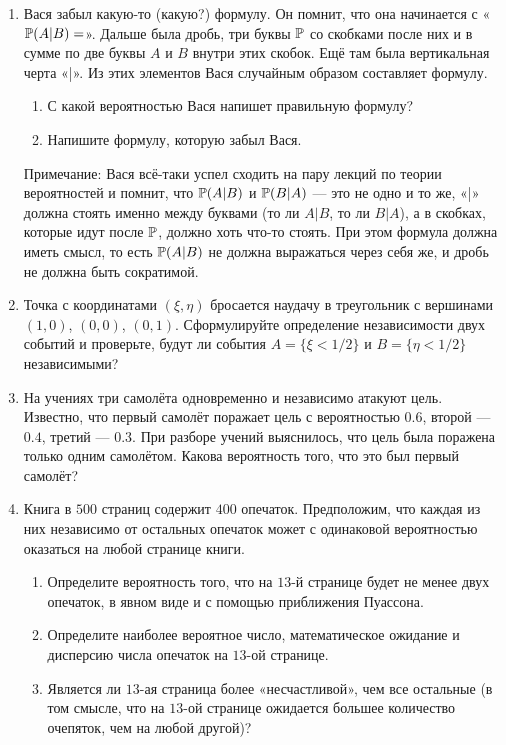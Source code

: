 \begin{enumerate}
\item Вася забыл какую-то (какую?) формулу. Он помнит, что она начинается
с «$\P(A|B) = $». Дальше была дробь, три буквы $\P$ со скобками после них и
в сумме по две буквы $A$ и $B$ внутри этих скобок. Ещё там была вертикальная черта «|».
Из этих элементов Вася случайным образом составляет формулу.
\begin{enumerate}
\item С какой вероятностью Вася напишет правильную формулу?
\item Напишите формулу, которую забыл Вася.
\end{enumerate}

Примечание: Вася всё-таки успел сходить на пару лекций по теории вероятностей и помнит,
что $\P(A|B)$ и $\P(B|A)$ — это не одно и то же, «|» должна стоять именно между буквами
(то ли $A|B$, то ли $B|A$), а в скобках, которые идут после $\P$, должно хоть что-то стоять.
При этом формула должна иметь смысл, то есть  $\P(A|B)$   не должна выражаться через себя же,
и дробь не должна быть сократимой.

\item Точка с координатами $(\xi, \eta)$ бросается наудачу в треугольник с вершинами
$(1,0)$, $(0,0)$, $(0,1)$. Сформулируйте определение независимости двух событий и
проверьте, будут ли события $A=\{ \xi < 1/2 \}$  и $B=\{ \eta < 1/2 \}$  независимыми?

\item На учениях три самолёта одновременно и независимо атакуют цель.
Известно, что первый самолёт поражает цель с вероятностью $0.6$, второй — $0.4$,
третий — $0.3$. При разборе учений выяснилось, что цель была поражена только
одним самолётом. Какова вероятность того, что это был первый самолёт?

\item Книга в $500$ страниц содержит $400$ опечаток. Предположим, что каждая
из них независимо от остальных опечаток может с одинаковой вероятностью оказаться
на любой странице книги.
\begin{enumerate}
\item Определите вероятность того, что на $13$-й странице будет не менее двух опечаток,
в явном виде и с помощью приближения Пуассона.
\item Определите наиболее вероятное число, математическое ожидание и дисперсию числа
опечаток на $13$-ой странице.
\item Является ли $13$-ая страница более «несчастливой», чем все остальные
(в том смысле, что на $13$-ой странице ожидается большее количество очепяток,
чем на любой другой)?
\end{enumerate}


\end{enumerate}
